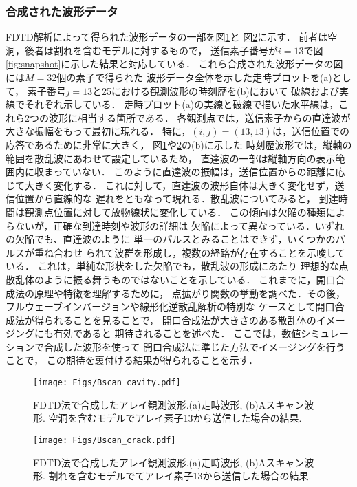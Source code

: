 \subsubsection{合成された波形データ}
FDTD解析によって得られた波形データの一部を図\ref{fig:bscan_cavity}と
図\ref{fig:bscan_crack}に示す．
前者は空洞，後者は割れを含むモデルに対するもので，
送信素子番号が$i=13$で図\ref{fig:snapshot}に示した結果と対応している．
これら合成された波形データの図には$M=32$個の素子で得られた
波形データ全体を示した走時プロットを(a)として，
素子番号$j=13$と25における観測波形の時刻歴を(b)において
破線および実線でそれぞれ示している．
走時プロット(a)の実線と破線で描いた水平線は，これら2つの波形に相当する箇所である．
各観測点では，送信素子からの直達波が大きな振幅をもって最初に現れる．
特に，$(i,j)=(13,13)$は，送信位置での応答であるために非常に大きく，
図\ref{fig:bscan_cavity}や\ref{fig:bscan_crack}の(b)に示した
時刻歴波形では，縦軸の範囲を散乱波にあわせて設定しているため，
直達波の一部は縦軸方向の表示範囲内に収まっていない．
このように直達波の振幅は，送信位置からの距離に応じて大きく変化する．
これに対して，直達波の波形自体は大きく変化せず，送信位置から直線的な
遅れをともなって現れる．散乱波についてみると，
到達時間は観測点位置に対して放物線状に変化している．
この傾向は欠陥の種類によらないが，正確な到達時刻や波形の詳細は
欠陥によって異なっている．いずれの欠陥でも、直達波のように
単一のパルスとみることはできず，いくつかのパルスが重ね合わせ
られて波群を形成し，複数の経路が存在することを示唆している．
これは，単純な形状をした欠陥でも，散乱波の形成にあたり
理想的な点散乱体のように振る舞うものではないことを示している．
%
これまでに，開口合成法の原理や特徴を理解するために，
点拡がり関数の挙動を調べた．その後，
フルウェーブインバージョンや線形化逆散乱解析の特別な
ケースとして開口合成法が得られることを見ることで，
開口合成法が大きさのある散乱体のイメージングにも有効であると
期待されることを述べた．
ここでは，数値シミュレーションで合成した波形を使って
開口合成法に準じた方法でイメージングを行うことで，
この期待を裏付ける結果が得られることを示す．
\begin{figure}[h]
	\begin{center}
	\texttt{[image: Figs/Bscan\_cavity.pdf]} 
	\end{center}
	\caption{FDTD法で合成したアレイ観測波形.(a)走時波形, (b)Aスキャン波形. 
	空洞を含むモデルでアレイ素子13から送信した場合の結果.} 
	\label{fig:bscan_cavity}
\end{figure}
\begin{figure}[h]
	\begin{center}
	\texttt{[image: Figs/Bscan\_crack.pdf]} 
	\end{center}
	\caption{FDTD法で合成したアレイ観測波形.(a)走時波形, (b)Aスキャン波形. 
	割れを含むモデルでてアレイ素子13から送信した場合の結果.} 
	\label{fig:bscan_crack}
\end{figure}
